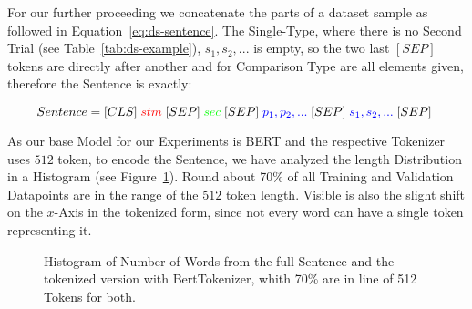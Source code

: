 \newpage


For our further proceeding we concatenate the parts of a dataset sample as followed in Equation~\ref{eq:ds-sentence}.
The Single-Type, where there is no Second Trial (see Table~\ref{tab:ds-example}), $s_1, s_2, ... $
is empty, so the two last $[SEP]$ tokens are directly after another and for Comparison Type are all elements given, 
therefore the Sentence is exactly:

\begin{equation}\label{eq:ds-sentence}
\resizebox{0.91\hsize}{!}{%
 $Sentence = [CLS] \; \textcolor{red}{stm}\;
             [SEP] \; \textcolor{green}{sec}\;
             [SEP] \; \textcolor{blue}{p_1, p_2, ... }\;
             [SEP] \; \textcolor{blue}{s_1, s_2, ... }\;
             [SEP]$      
}
\end{equation}

As our base Model for our Experiments is BERT and the respective Tokenizer uses $512$ token, to encode the Sentence, 
we have analyzed the length Distribution in a Histogram (see Figure~\ref{cap:hist}). 
Round about 70\% of all Training and Validation Datapoints are in the range of the $512$ token length. 
Visible is also the slight shift on the $x$-Axis in the tokenized form, since not every word can have a single token
representing it.

\begin{figure}[!htb]
    \hspace*{-4.5cm}
    \centering
    
    \caption{Histogram of Number of Words from the full Sentence and the tokenized version with BertTokenizer, 
             whith 70\% are in line of 512 Tokens for both.}\label{cap:hist}
\end{figure}